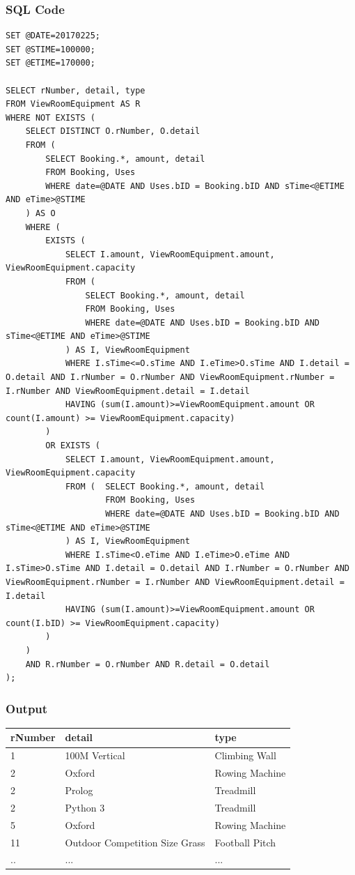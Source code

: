 \documentclass[a4paper, titlepage]{article}
\begin{document}
\subsubsection*{SQL Code}
\begin{verbatim}
SET @DATE=20170225;
SET @STIME=100000;
SET @ETIME=170000;

SELECT rNumber, detail, type
FROM ViewRoomEquipment AS R
WHERE NOT EXISTS (
	SELECT DISTINCT O.rNumber, O.detail
	FROM (	
		SELECT Booking.*, amount, detail
		FROM Booking, Uses
		WHERE date=@DATE AND Uses.bID = Booking.bID AND sTime<@ETIME AND eTime>@STIME
	) AS O
	WHERE (
		EXISTS (
			SELECT I.amount, ViewRoomEquipment.amount, ViewRoomEquipment.capacity
			FROM (
				SELECT Booking.*, amount, detail
				FROM Booking, Uses
				WHERE date=@DATE AND Uses.bID = Booking.bID AND sTime<@ETIME AND eTime>@STIME
			) AS I, ViewRoomEquipment
			WHERE I.sTime<=O.sTime AND I.eTime>O.sTime AND I.detail = O.detail AND I.rNumber = O.rNumber AND ViewRoomEquipment.rNumber = I.rNumber AND ViewRoomEquipment.detail = I.detail 
			HAVING (sum(I.amount)>=ViewRoomEquipment.amount OR count(I.amount) >= ViewRoomEquipment.capacity)
		)
		OR EXISTS (
			SELECT I.amount, ViewRoomEquipment.amount, ViewRoomEquipment.capacity
			FROM (	SELECT Booking.*, amount, detail
					FROM Booking, Uses
					WHERE date=@DATE AND Uses.bID = Booking.bID AND sTime<@ETIME AND eTime>@STIME
			) AS I, ViewRoomEquipment
			WHERE I.sTime<O.eTime AND I.eTime>O.eTime AND I.sTime>O.sTime AND I.detail = O.detail AND I.rNumber = O.rNumber AND ViewRoomEquipment.rNumber = I.rNumber AND ViewRoomEquipment.detail = I.detail 
			HAVING (sum(I.amount)>=ViewRoomEquipment.amount OR count(I.bID) >= ViewRoomEquipment.capacity)
		)
	)
	AND R.rNumber = O.rNumber AND R.detail = O.detail
);
\end{verbatim}

\subsubsection*{Output}
\begin{tabulary}{1.2\textwidth}{ l l l}
	rNumber & detail & type \\  & 100M Vertical & Climbing Wall \\
	2 & Oxford & Rowing Machine \\
	2 & Prolog & Treadmill \\
	2 & Python 3 & Treadmill \\
	5 & Oxford & Rowing Machine \\
	11 & Outdoor Competition Size Grass & Football Pitch \\
	.. & ... & ...\\
	\bottomrule
\end{tabulary}
\end{document}
